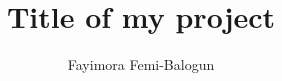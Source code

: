 \documentclass[a4paper,12pt,twoside]{report}
\begin{document}
\title{\LARGE {\bf Title of my project}\\
 \vspace*{6mm}
}

\author{Fayimora Femi-Balogun}
\normallinespacing
\maketitle

\preface

%
%
%

\body




%



%
%
\end{document}
